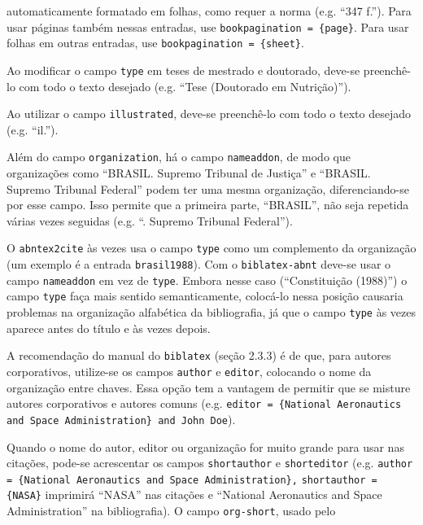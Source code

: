 \documentclass[a4paper]{article}
\begin{document}
\begin{itemize}
\begin{sloppypar}
    automaticamente formatado em folhas, como requer a norma (e.g. ``347
    f.''). Para usar páginas também nessas entradas, use
    \texttt{bookpagination =
    \{page\}}. Para usar folhas em outras entradas, use
    \texttt{bookpagination = \{sheet\}}.
  \item Ao modificar o campo \texttt{type} em teses de mestrado e doutorado,
    deve-se preenchê-lo com todo o texto desejado (e.g. ``Tese (Doutorado em
    Nutrição)'').
  \item Ao utilizar o campo \texttt{illustrated}, deve-se preenchê-lo com
    todo o texto desejado (e.g. ``il.'').
  \item Além do campo \texttt{organization}, há o campo \texttt{nameaddon},
    de modo que organizações como ``BRASIL. Supremo Tribunal de Justiça'' e
    ``BRASIL. Supremo Tribunal Federal'' podem ter uma mesma organização,
    diferenciando-se por esse campo. Isso permite que a primeira parte,
    ``BRASIL'', não seja repetida várias vezes seguidas (e.g.
    ``\underline{\hspace*{4em}}. Supremo Tribunal Federal'').
  \item O \texttt{abntex2cite} às vezes usa o campo \texttt{type} como um
    complemento da organização (um exemplo é a entrada
    \texttt{brasil1988}).
    Com o \texttt{biblatex-abnt} deve-se usar o campo \texttt{nameaddon} em
    vez de \texttt{type}. Embora nesse caso (``Constituição (1988)'') o
    campo
    \texttt{type} faça mais sentido semanticamente, colocá-lo nessa
    posição causaria problemas na organização alfabética da bibliografia,
    já que o campo \texttt{type} às vezes aparece antes do título e às
    vezes depois.
  \item A recomendação do manual do \texttt{biblatex} (seção 2.3.3) é de
    que, para autores corporativos, utilize-se os campos \texttt{author} e
    \texttt{editor}, colocando o nome da organização entre chaves. Essa
    opção tem a vantagem de permitir que se misture autores corporativos e
    autores comuns (e.g. \texttt{editor = \{National Aeronautics and Space
    Administration\} and John Doe}).
  \item Quando o nome do autor, editor ou organização for muito grande para
    usar nas citações, pode-se acrescentar os campos \texttt{short\-author}
    e \texttt{short\-editor} (e.g. \texttt{author = \{National Aeronautics and
    Space Ad\-min\-is\-tra\-tion\},} \texttt{short\-author = \{NASA\}}
    imprimirá ``NASA'' nas citações e ``National Aeronautics and Space
    Administration'' na bibliografia). O campo \texttt{org-short}, usado pelo

\end{sloppypar}
\end{itemize}
\end{document}

